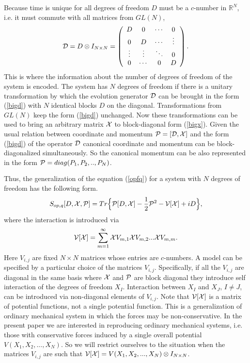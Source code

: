 \documentclass[a4paper,11pt]{article}
\begin{document}
Because time is unique for all degrees of freedom $D$ must be a
$c$-number in $\mathbb{R}^N$, i.e. it must commute with all
matrices from $GL(N)$,
\begin{eqnarray}
{\cal D}= D\otimes I_{N\times N}=\left(
\begin{array}{cccc}
D & 0 & \cdots & 0 \\
0 & D & \cdots & \vdots \\
\vdots & \vdots & \ddots & 0 \\
0 & \cdots & 0 & D
\end{array} \right).
\label{bigd}
\end{eqnarray}
This is where the information about the number of degrees of
freedom of the system is encoded. The system has $N$ degrees of
freedom if there is a unitary transformation by which the
evolution generator ${\cal D}$ can be brought in the form
(\ref{bigd}) with $N$ identical blocks $D$ on the diagonal.
Transformations from $GL(N)$ keep the form (\ref{bigd}) unchanged.
Now these transformations can be used to bring an arbitrary matrix
${\cal X}$ to block-diagonal form (\ref{bigx}). Given the usual
relation between coordinate and momentum ${\cal P}=[{\cal D},{\cal
X}]$ and the form (\ref{bigd}) of the operator ${\cal D}$
canonical coordinate and momentum can be block-diagonalized
simultaneously. So the canonical momentum can be also represented
in the form ${\cal P}=diag(P_1,P_2,..,P_N)$.

Thus, the generalization of the equation (\ref{opfq}) for a system
with $N$ degrees of freedom has the following form.
\begin{equation}
S_{op,q}[D,{\cal X},{\cal P}]=Tr \Big\{ {\cal P}[D,{\cal
X}]-\frac{1}{2}{\cal P}^2 -{\cal V}[{\cal X}]+iD \Big\},
\label{opfqn}
\end{equation}
where the interaction is introduced via
\begin{eqnarray}
{\cal V}[{\cal X}]=\sum\limits_{m=1}^{\infty}{\cal X}V_{m,1} {\cal
X}V_{m,2}...{\cal X}V_{m,m}. \label{inter}
\end{eqnarray}
Here $V_{i,j}$ are fixed $N \times N$ matrices whose entries are
$c$-numbers. A model can be specified by a particular choice of
the matrices $V_{i,j}$. Specifically, if all the $V_{i,j}$ are
diagonal in the same basis where ${\cal X}$ and ${\cal P}$ are
block diagonal they introduce self interaction of the degrees of
freedom $X_I$. Interaction between $X_I$ and $X_J$, $I\not=J$, can
be introduced via non-diagonal elements of $V_{i,j}$. Note that
${\cal V}[{\cal X}]$ is a matrix of potential functions, not a
single potential function. This is a generalization of ordinary
mechanical system in which the forces may be non-conservative. In
the present paper we are interested in reproducing ordinary
mechanical systems, i.e. those with conservative forces induced by
a single overall potential $V(X_1,X_2,...,X_N)$. So we will
restrict ourselves to the situation when the matrices $V_{i,j}$
are such that ${\cal V}[{\cal X}]=V(X_1,X_2,...,X_N)\otimes
I_{N\times N}$.
\end{document}
